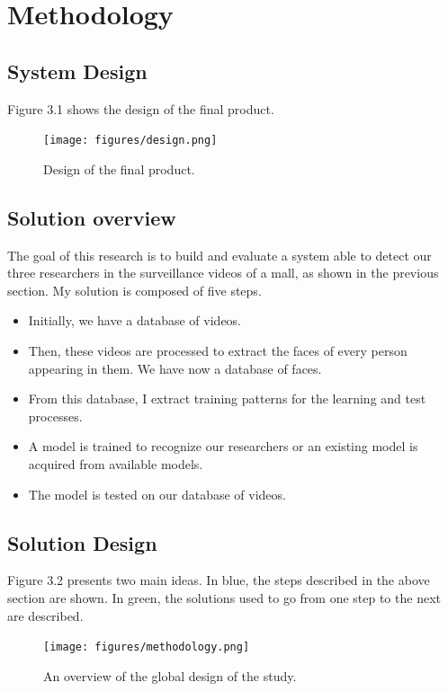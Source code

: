 \setlength{\footskip}{8mm}

\chapter{Methodology}
\label{ch:methodology}

\section{System Design}
Figure 3.1 shows the design of the final product. 
\begin{figure}[!ht]
  \centering
  \texttt{[image: figures/design.png]}  
  \caption[Design of the final product.]{Design of the final product.}
  \label{fig:Design}
\end{figure}
\FloatBarrier

\section{Solution overview}

The goal of this research is to build and evaluate a system able to detect our three researchers in the surveillance videos of a mall, as shown in the previous section. My solution is composed of five steps.
\begin{itemize}
\item Initially, we have a database of videos.\newline
\item Then, these videos are processed to extract the faces of every person appearing in them. We have now a database of faces.\newline
\item From this database, I extract training patterns for the learning and test processes.\newline
\item A model is trained to recognize our researchers or an existing model is acquired from available models.\newline
\item The model is tested on our database of videos.
\end{itemize}

\section{Solution Design}

Figure 3.2 presents two main ideas. In blue, the steps described in the above section are shown. In green, the solutions used to go from one step to the next are described.\newline
\begin{figure}[!ht]
  \centering
  \texttt{[image: figures/methodology.png]}  
  \caption[An overview of the global design of the study.]{An overview of the global design of the study.}
  \label{fig:Methodology}
\end{figure}
\FloatBarrier

